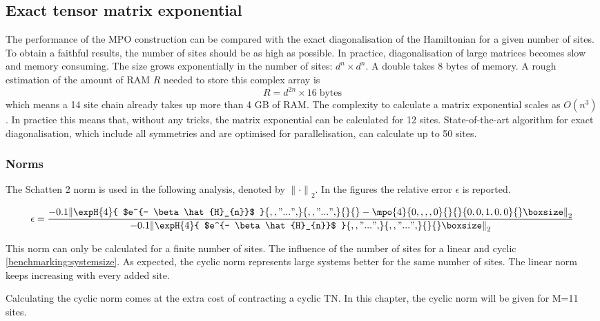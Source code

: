 
\subsection{Exact tensor matrix exponential } \label{chap_bench}

The performance of the \Gls{MPO} construction can be compared with the exact diagonalisation of the Hamiltonian for a given number of sites. To obtain a faithful results, the number of sites should be as high as possible. In practice, diagonalisation of large matrices becomes slow and memory consuming. The size grows exponentially in the number of sites: $d^{n} \times d^{n} $. A double takes 8 bytes of memory. A rough estimation of the amount of RAM $R$ needed to store this complex array is
\begin{equation}
    R = d^{2 n} \times 16 \; \text{bytes}
\end{equation}
which means a 14 site chain already takes up more than 4 GB of RAM. The complexity to calculate a matrix exponential scales as $O(n^3)$ \cite{Moler2003}. In practice this means that, without any tricks, the matrix exponential can be calculated for 12 sites.  State-of-the-art algorithm for exact diagonalisation, which include all symmetries and are optimised for parallelisation, can calculate up to 50 sites. \cite{Wietek2018}

\subsubsection{Norms} \label{mponormdef}
\def \expHBlock {\expH{4}{ $e^{- \beta \hat{H}_{n}}$   }{ {,,"...",} }{ {,,"...",} }{}{} }
\def \Mn {\mpo{4}{ {0,,,,0}  }{}{}{{0,0,1,0,0}}{}}

The Schatten 2 norm is used in the following analysis, denoted by ${\| \cdot \|} _{2}$. In the figures the relative error $\epsilon$ is reported.

\begin{equation}
    \epsilon = \frac{  {  \left \|  \expHBlock - \Mn  \right \|} _{2}  }{ {  \left\|  \expHBlock \right \|}_2}
\end{equation}

This norm can only be calculated for a finite number of sites. The influence of the number of sites for a linear  and cyclic \cref{benchmarking:systemsize}. As expected, the cyclic norm represents large systems better for the same number of sites. The linear norm keeps increasing with every added site.

Calculating the cyclic norm comes at the extra cost of contracting a cyclic \Gls{TN}. In this chapter, the cyclic norm will be given for M=11 sites.

